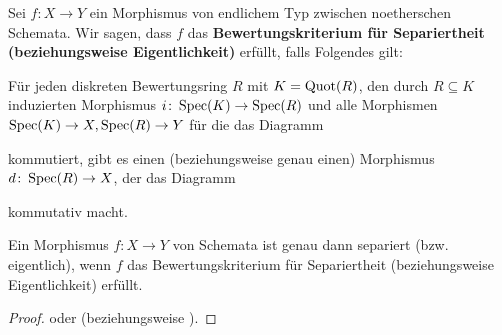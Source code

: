 \begin{bem}
	\label{bem:10.6}
	Sei $f\colon X \to Y$ ein Morphismus von endlichem Typ zwischen noetherschen Schemata.
	Wir sagen, dass $f$ das \textbf{Bewertungskriterium für Separiertheit (beziehungsweise Eigentlichkeit)} erfüllt, falls Folgendes gilt:
		
	Für jeden diskreten Bewertungsring $R$ mit $K = \operatorname{Quot}(R)$, den durch $R \subseteq K$ induzierten Morphismus $i \colon \operatorname{Spec}(K) \to \operatorname{Spec}(R)$ und alle Morphismen $\operatorname{Spec}(K) \to X, \operatorname{Spec}(R) \to Y$ für die das Diagramm
	\begin{center}
	\end{center}
	kommutiert, gibt es einen (beziehungsweise genau einen) Morphismus $d \colon \operatorname{Spec}(R) \to X$, der das Diagramm
	\begin{center}
	\end{center}
	kommutativ macht.
\end{bem}

\begin{thm}
	\label{thm:10.7}
	Ein Morphismus $f \colon X \to Y$ von Schemata ist genau dann separiert (bzw. eigentlich), wenn $f$ das Bewertungskriterium für Separiertheit (beziehungsweise Eigentlichkeit) erfüllt.
	\begin{proof}
		\cite[Proposition~7.2.3]{grothendieck1961elements} oder \cite[Theorem~15.9]{goertz2010algebraic} (beziehungsweise \cite[Theorèm~7.3.8]{grothendieck1961elements}).
	\end{proof}
\end{thm}

